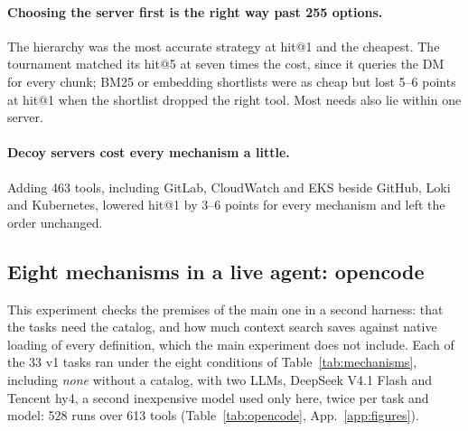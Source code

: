 \documentclass[11pt]{article}
\begin{document}
\paragraph{Choosing the server first is the right way past 255 options.} The hierarchy was the most accurate
strategy at hit@1 and the cheapest. The tournament matched its hit@5 at seven times the cost, since it queries the
DM for every chunk; BM25 or embedding shortlists were as cheap but lost 5--6 points at hit@1 when the shortlist
dropped the right tool. Most needs also lie within one server.

\paragraph{Decoy servers cost every mechanism a little.} Adding 463 tools, including GitLab, CloudWatch and EKS
beside GitHub, Loki and Kubernetes, lowered hit@1 by 3--6 points for every mechanism and left the order
unchanged.

\subsection{Eight mechanisms in a live agent: opencode}\label{sec:opencode}
This experiment checks the premises of the main one in a second harness: that the tasks need the catalog, and how
much context search saves against native loading of every definition, which the main experiment does not
include. Each of the 33 v1 tasks ran under the eight conditions of Table~\ref{tab:mechanisms}, including
\emph{none} without a catalog, with two LLMs, DeepSeek V4.1 Flash and Tencent hy4, a second inexpensive model used
only here, twice per task and model: 528 runs over 613 tools (Table~\ref{tab:opencode}, App.~\ref{app:figures}).
\end{document}
